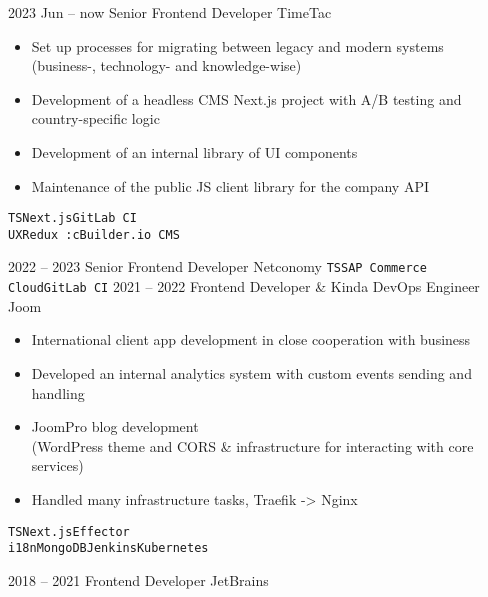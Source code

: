 \documentclass[2pt]{template}
\begin{document}
\begin{entrylist}
    \entry
	{2023 Jun -- now}
	{Senior Frontend Developer}
	{TimeTac}
	{
		\begin{itemize}[noitemsep,topsep=5pt,leftmargin=8pt]
			\item Set up processes for migrating between legacy and modern systems\\(business-, technology- and knowledge-wise)
			\item Development of a headless CMS Next.js project with A/B testing and country-specific logic
			\item Development of an internal library of UI components
			\item Maintenance of the public JS client library for the company API
		\end{itemize}
		\texttt{TS}\slashsep\texttt{Next.js}\slashsep\texttt{GitLab CI}\\
		{\color{gray}\texttt{UX}\slashsep\texttt{Redux :c}\slashsep\texttt{Builder.io CMS}}}
    \entry
	{2022 -- 2023}
	{Senior Frontend Developer}
	{Netconomy}
	{
		\texttt{TS}\slashsep\texttt{SAP Commerce Cloud}\slashsep\texttt{GitLab CI}}
    \entry
	{2021 -- 2022}
	{Frontend Developer \& Kinda DevOps Engineer}
	{Joom}
	{
	        \begin{itemize}[noitemsep,topsep=5pt,leftmargin=8pt]
		        \item International client app development in close cooperation with business
		        \item Developed an internal analytics system with custom events sending and handling
			    \item JoomPro blog development\\ (WordPress theme and CORS \& infrastructure for interacting with core services)
		        \item Handled many infrastructure tasks, Traefik -> Nginx
		\end{itemize}
		\texttt{TS}\slashsep\texttt{Next.js}\slashsep\texttt{Effector}\\
		{\color{gray}\texttt{i18n}\slashsep\texttt{MongoDB}\slashsep\texttt{Jenkins}\slashsep\texttt{Kubernetes}}}
	\entry
	{2018 -- 2021}
	{Frontend Developer}
	{JetBrains}
	{
}
\end{entrylist}
\end{document}
